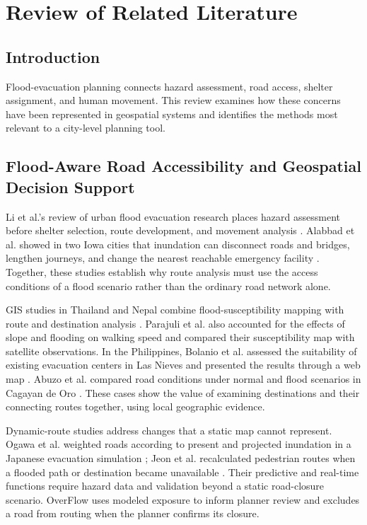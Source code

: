 \newpage
\section{Review of Related Literature}
\label{Review of Related Literature}
\renewcommand{\thefigure}{\thesection.\arabic{figure}}
\setcounter{figure}{0}
\renewcommand{\thetable}{\thesection.\arabic{table}}
\setcounter{table}{0}

\subsection{Introduction}

Flood-evacuation planning connects hazard assessment, road access, shelter assignment, and human movement. This review examines how these concerns have been represented in geospatial systems and identifies the methods most relevant to a city-level planning tool.

\subsection{Flood-Aware Road Accessibility and Geospatial Decision Support}

Li et al.'s review of urban flood evacuation research places hazard assessment before shelter selection, route development, and movement analysis \cite{li2025}. Alabbad et al. showed in two Iowa cities that inundation can disconnect roads and bridges, lengthen journeys, and change the nearest reachable emergency facility \cite{alabbad2024}. Together, these studies establish why route analysis must use the access conditions of a flood scenario rather than the ordinary road network alone.

GIS studies in Thailand and Nepal combine flood-susceptibility mapping with route and destination analysis \cite{suwanno2023,parajuli2023}. Parajuli et al. also accounted for the effects of slope and flooding on walking speed and compared their susceptibility map with satellite observations. In the Philippines, Bolanio et al. assessed the suitability of existing evacuation centers in Las Nieves and presented the results through a web map \cite{bolanio2023}. Abuzo et al. compared road conditions under normal and flood scenarios in Cagayan de Oro \cite{abuzo2024}. These cases show the value of examining destinations and their connecting routes together, using local geographic evidence.

Dynamic-route studies address changes that a static map cannot represent. Ogawa et al. weighted roads according to present and projected inundation in a Japanese evacuation simulation \cite{ogawa2023}; Jeon et al. recalculated pedestrian routes when a flooded path or destination became unavailable \cite{jeon2023}. Their predictive and real-time functions require hazard data and validation beyond a static road-closure scenario. OverFlow uses modeled exposure to inform planner review and excludes a road from routing when the planner confirms its closure.

